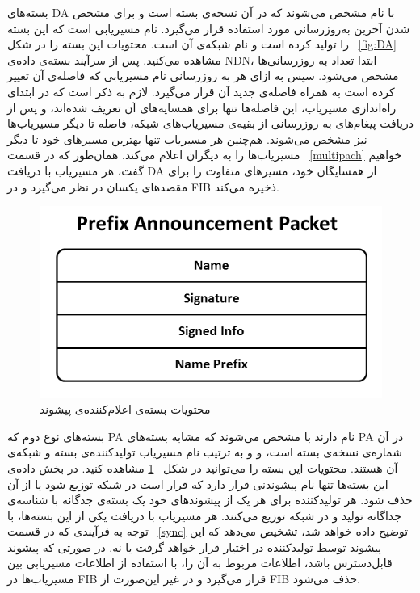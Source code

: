 بسته‌های DA با نام  مشخص می‌شوند که در آن  نسخه‌ی بسته است و برای مشخص شدن آخرین به‌روزرسانی مورد استفاده قرار می‌گیرد.  نام مسیریابی است که این بسته را تولید کرده است و  نام شبکه‌ی آن است. محتویات این بسته را در شکل ~\ref{fig:DA} مشاهده می‌کنید. پس از سرآیند بسته‌ی داده‌ی NDN، ابتدا تعداد به روزرسانی‌ها مشخص می‌شود. سپس به ازای هر به روزرسانی نام مسیریابی که فاصله‌ی آن تغییر کرده است به همراه فاصله‌ی جدید آن قرار می‌گیرد. لازم به ذکر است که در ابتدای راه‌اندازی مسیریاب، این فاصله‌ها تنها برای همسایه‌های آن تعریف شده‌اند، و پس از دریافت پیغام‌های به روزرسانی از بقیه‌ی مسیریاب‌های شبکه، فاصله تا دیگر مسیریاب‌ها نیز مشخص می‌شوند. هم‌چنین هر مسیریاب تنها بهترین مسیرهای خود تا دیگر مسیریاب‌ها را به دیگران اعلام می‌کند. همان‌طور که در قسمت ‍~\ref{multipach} خواهیم گفت، هر مسیریاب با دریافت DA از همسایگان خود، مسیرهای متفاوت را برای مقصد‌های یکسان در نظر می‌گیرد و در FIB ذخیره می‌کند.


\begin{figure}[hb!]
\centering
\includegraphics[scale=0.6]{./resources/figures/PA.png}
\caption{محتویات بسته‌ی اعلام‌کننده‌ی پیشوند}
\label{fig:PA}
\end{figure}

بسته‌های نوع دوم که PA نام دارند با  مشخص می‌شوند که مشابه بسته‌های PA در آن   شماره‌ی نسخه‌ی بسته است، و  و  به ترتیب نام مسیریاب تولیدکننده‌ی بسته و شبکه‌ی آن هستند. محتویات این بسته را می‌توانید در شکل ~\ref{fig:PA} مشاهده کنید. در بخش داده‌ی این بسته‌ها تنها نام پیشوندنی قرار دارد که قرار است در شبکه توزیع شود یا از آن حذف شود. هر تولید‌کننده برای هر یک از پیشوند‌های خود یک بسته‌ی جدگانه با شناسه‌ی جداگانه تولید و در شبکه توزیع می‌کنند. هر مسیریاب با دریافت یکی از این بسته‌ها، با توجه به فرآیندی که در قسمت ~\ref{sync} توضیح داده خواهد شد، تشخیص می‌دهد که این پیشوند توسط تولیدکننده در اختیار قرار خواهد گرفت یا نه. در صورتی که پیشوند قابل‌دسترس باشد، اطلاعات مربوط به آن را، با استفاده از اطلاعات مسیریابی بین مسیریاب‌ها در FIB قرار می‌گیرد و در غیر این‌صورت از FIB حذف می‌شود. 


